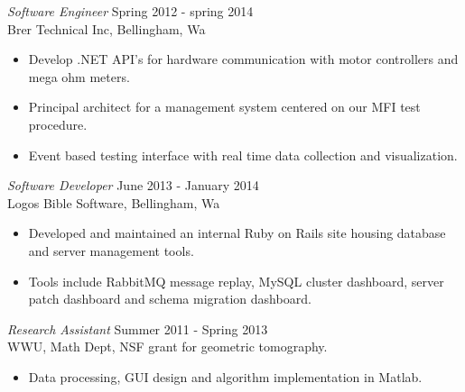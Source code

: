 \documentclass[line,margin]{res}
\begin{document}
\begin{resume}
		{\sl Software Engineer} \hfill Spring 2012 - spring 2014 \\
                	Brer Technical Inc, Bellingham, Wa
                	\begin{itemize}  \itemsep -2pt
                		\item Develop .NET API's for hardware communication with motor controllers and mega ohm meters.
                		\item Principal architect for a management system centered on our MFI test procedure.
			\item Event based testing interface with real time data collection and visualization.  
               	 \end{itemize}
 
		{\sl Software Developer} \hfill June 2013 - January 2014 \\
                	Logos Bible Software, Bellingham, Wa
               	 \begin{itemize}  \itemsep -2pt
                		\item Developed and maintained an internal Ruby on Rails site housing database and server management tools. 
	     		\item Tools include RabbitMQ message replay, MySQL cluster dashboard, server patch dashboard and schema migration dashboard.
                	\end{itemize}

                	{\sl Research Assistant} \hfill            Summer 2011 - Spring 2013 \\
                	WWU, Math Dept, NSF grant for geometric tomography.
                 	\begin{itemize}  \itemsep -2pt
                 		\item Data processing, GUI design and algorithm implementation in Matlab.
                 	\end{itemize} 


	

\end{resume}
\end{document}
